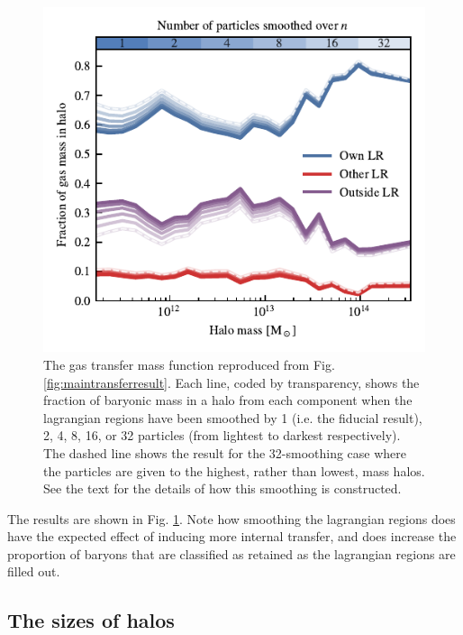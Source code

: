 \begin{figure}
	\centering
	\includegraphics{figures/convergence_smoothing.pdf}
	\vspace{-0.7cm}
	\caption{The gas transfer mass function reproduced from Fig.
		\ref{fig:maintransferresult}. Each line, coded by transparency,
		shows the fraction of baryonic mass in a halo from each component
		when the lagrangian regions have been smoothed by 1 (i.e. the fiducial result), 2, 4, 8, 16,
		or 32 particles (from lightest to darkest respectively). The dashed
		line shows the result for the 32-smoothing case where the particles are
		given to the highest, rather than lowest, mass halos. See the
		text for the details of how this smoothing is constructed.
	}
	\label{fig:smoothconv}
\end{figure}

The results are shown in Fig. \ref{fig:smoothconv}. Note how smoothing the
lagrangian regions does have the expected effect of inducing more internal
transfer, and does increase the proportion of baryons that are classified
as retained as the lagrangian regions are filled out.

\subsection{The sizes of halos}


